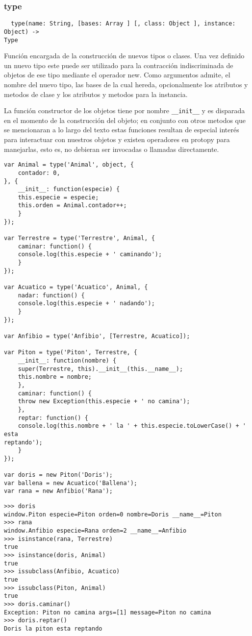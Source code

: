 \subsubsection*{type}
\begin{verbatim}
  type(name: String, [bases: Array ] [, class: Object ], instance: Object) ->
Type
\end{verbatim} 
Función encargada de la construcción de nuevos tipos o clases.
Una vez definido un nuevo tipo este puede ser utilizado para la contracción
indiscriminada de objetos de ese tipo mediante el operador new.
Como argumentos admite, el nombre del nuevo tipo, las bases de la cual hereda,
opcionalmente los atributos y metodos de clase y los atributos y metodos para la
instancia.

La función constructor de los objetos tiene por nombre \verb|__init__| y es
disparada
en el momento de la construcción del objeto; en conjunto con otros metodos que
se mencionaran a lo largo del texto estas funciones resultan de especial interés
para interactuar con nuestros objetos y existen operadores en protopy para
manejarlas, esto es, no debieran ser invocadas o llamadas directamente.
\begin{lstlisting}[style=javascript,label=definicion-de-tipos,caption=Definicion
de tipos]
var Animal = type('Animal', object, {
    contador: 0,
}, {
    __init__: function(especie) {
	this.especie = especie;
	this.orden = Animal.contador++;
    }
});

var Terrestre = type('Terrestre', Animal, {
    caminar: function() {
	console.log(this.especie + ' caminando');
    }
});

var Acuatico = type('Acuatico', Animal, {
    nadar: function() {
	console.log(this.especie + ' nadando');
    }
});

var Anfibio = type('Anfibio', [Terrestre, Acuatico]);

var Piton = type('Piton', Terrestre, {
    __init__: function(nombre) {
	super(Terrestre, this).__init__(this.__name__);
	this.nombre = nombre;
    },
    caminar: function() {
	throw new Exception(this.especie + ' no camina');
    },
    reptar: function() {
	console.log(this.nombre + ' la ' + this.especie.toLowerCase() + ' esta
reptando');
    }
});

var doris = new Piton('Doris');
var ballena = new Acuatico('Ballena');
var rana = new Anfibio('Rana');
\end{lstlisting}
\begin{lstlisting}[style=consola]
>>> doris
window.Piton especie=Piton orden=0 nombre=Doris __name__=Piton
>>> rana
window.Anfibio especie=Rana orden=2 __name__=Anfibio
>>> isinstance(rana, Terrestre)
true
>>> isinstance(doris, Animal)
true
>>> issubclass(Anfibio, Acuatico)
true
>>> issubclass(Piton, Animal)
true
>>> doris.caminar()
Exception: Piton no camina args=[1] message=Piton no camina
>>> doris.reptar()
Doris la piton esta reptando
\end{lstlisting}

